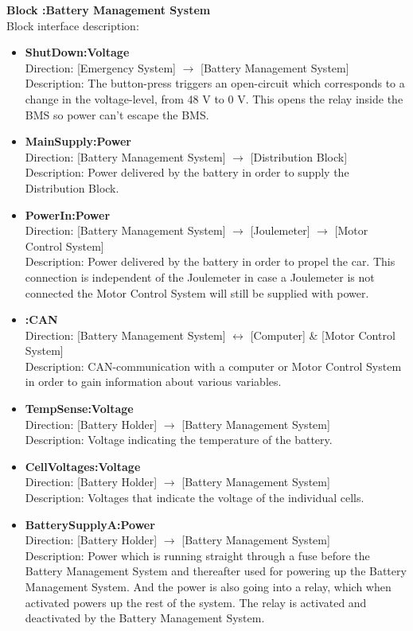 \textbf{Block :Battery Management System}\\
Block interface description:
\begin{itemize}
	\item \textbf{ShutDown:Voltage}\\
	Direction: [Emergency System] $\rightarrow$ [Battery Management System]\\
	Description: The button-press triggers an open-circuit which corresponds to a change in the voltage-level, from 48 V to 0 V. This opens the relay inside the BMS so power can't escape the BMS.
	\item \textbf{MainSupply:Power}\\
	Direction: [Battery Management System] $\rightarrow$ [Distribution Block]\\
	Description: Power delivered by the battery in order to supply the Distribution Block.
	\item \textbf{PowerIn:Power}\\
	Direction: [Battery Management System] $\rightarrow$ [Joulemeter] $\rightarrow$ [Motor Control System]\\
	Description: Power delivered by the battery in order to propel the car. This connection is independent of the Joulemeter in case a Joulemeter is not connected the Motor Control System will still be supplied with power.
	\item \textbf{:CAN}\\
	Direction: [Battery Management System] $\leftrightarrow$ [Computer] \& [Motor Control System]\\
	Description: CAN-communication with a computer or Motor Control System in order to gain information about various variables.
	\item \textbf{TempSense:Voltage}\\
	Direction: [Battery Holder] $\rightarrow$ [Battery Management System]\\
	Description: Voltage indicating the temperature of the battery.
	\item \textbf{CellVoltages:Voltage}\\
	Direction: [Battery Holder] $\rightarrow$ [Battery Management System]\\
	Description: Voltages that indicate the voltage of the individual cells.
	\item \textbf{BatterySupplyA:Power}\\
	Direction: [Battery Holder] $\rightarrow$ [Battery Management System]\\
	Description: Power which is running straight through a fuse before the Battery Management System and thereafter used for powering up the Battery Management System. And the power is also going into a relay, which when activated powers up the rest of the system. The relay is activated and deactivated by the Battery Management System.
	
\end{itemize}

